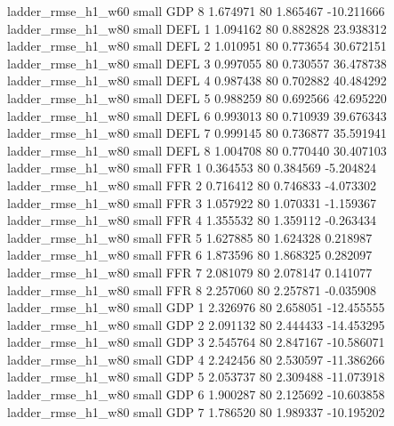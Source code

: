       ladder_rmse_h1_w60      small      GDP                 8 1.674971 80       1.865467         -10.211666
      ladder_rmse_h1_w80      small     DEFL                 1 1.094162 80       0.882828          23.938312
      ladder_rmse_h1_w80      small     DEFL                 2 1.010951 80       0.773654          30.672151
      ladder_rmse_h1_w80      small     DEFL                 3 0.997055 80       0.730557          36.478738
      ladder_rmse_h1_w80      small     DEFL                 4 0.987438 80       0.702882          40.484292
      ladder_rmse_h1_w80      small     DEFL                 5 0.988259 80       0.692566          42.695220
      ladder_rmse_h1_w80      small     DEFL                 6 0.993013 80       0.710939          39.676343
      ladder_rmse_h1_w80      small     DEFL                 7 0.999145 80       0.736877          35.591941
      ladder_rmse_h1_w80      small     DEFL                 8 1.004708 80       0.770440          30.407103
      ladder_rmse_h1_w80      small      FFR                 1 0.364553 80       0.384569          -5.204824
      ladder_rmse_h1_w80      small      FFR                 2 0.716412 80       0.746833          -4.073302
      ladder_rmse_h1_w80      small      FFR                 3 1.057922 80       1.070331          -1.159367
      ladder_rmse_h1_w80      small      FFR                 4 1.355532 80       1.359112          -0.263434
      ladder_rmse_h1_w80      small      FFR                 5 1.627885 80       1.624328           0.218987
      ladder_rmse_h1_w80      small      FFR                 6 1.873596 80       1.868325           0.282097
      ladder_rmse_h1_w80      small      FFR                 7 2.081079 80       2.078147           0.141077
      ladder_rmse_h1_w80      small      FFR                 8 2.257060 80       2.257871          -0.035908
      ladder_rmse_h1_w80      small      GDP                 1 2.326976 80       2.658051         -12.455555
      ladder_rmse_h1_w80      small      GDP                 2 2.091132 80       2.444433         -14.453295
      ladder_rmse_h1_w80      small      GDP                 3 2.545764 80       2.847167         -10.586071
      ladder_rmse_h1_w80      small      GDP                 4 2.242456 80       2.530597         -11.386266
      ladder_rmse_h1_w80      small      GDP                 5 2.053737 80       2.309488         -11.073918
      ladder_rmse_h1_w80      small      GDP                 6 1.900287 80       2.125692         -10.603858
      ladder_rmse_h1_w80      small      GDP                 7 1.786520 80       1.989337         -10.195202

